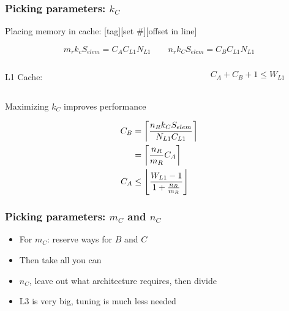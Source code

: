 \documentclass{beamer}
\DeclarePairedDelimiter\ceil{\lceil}{\rceil}
\DeclarePairedDelimiter\floor{\lfloor}{\rfloor}
\begin{document}
\begin{frame}
  \frametitle{Picking parameters: $k_C$}
  Placing memory in cache: [tag][set \#][offset in line]

  \begin{equation*}
    m_rk_cS_{elem} = C_AC_{L1}N_{L1} \qquad n_rk_CS_{elem} = C_BC_{L1}N_{L1}
  \end{equation*}

  \begin{columns}
    \begin{column}{0.1\textwidth}
      L1 Cache:
    \end{column}
    \begin{column}{0.5\textwidth}
      \centering
    \end{column}
    \begin{column}{0.25\textwidth}
      \begin{equation*}
        C_A + C_B + 1 \leq W_{L1}
      \end{equation*}
    \end{column}
  \end{columns}
  \begin{center}
    Maximizing $k_C$ improves performance
  \end{center}

  \begin{align*}
    C_B &= \ceil*{\frac{n_Rk_CS_{elem}}{N_{L1}C_{L1}}}\\
        &= \ceil*{\frac{n_R}{m_R}C_A}\\
    C_A &\leq \floor*{\frac{W_{L1} - 1}{1 + \frac{n_R}{m_R}}}
  \end{align*}
\end{frame}

\begin{frame}
  \frametitle{Picking parameters: $m_C$ and $n_C$}
  \begin{itemize}
  \item For $m_C$: reserve ways for $B$ and $C$
  \item Then take all you can
  \item $n_C$, leave out what architecture requires, then divide
  \item L3 is very big, tuning is much less needed
  \end{itemize}
\end{frame}
\end{document}
